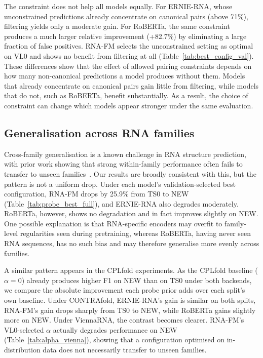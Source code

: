 \documentclass[logo,bsc,singlespacing,parskip]{infthesis}
\begin{document}
The constraint does not help all models equally. For ERNIE-RNA, whose unconstrained predictions already concentrate on canonical pairs (above 71\%), filtering yields only a moderate gain. For RoBERTa, the same constraint produces a much larger relative improvement (+82.7\%) by eliminating a large fraction of false positives. RNA-FM selects the unconstrained setting as optimal on VL0 and shows no benefit from filtering at all (Table~\ref{tab:best_config_val}). These differences show that the effect of allowed pairing constraints depends on how many non-canonical predictions a model produces without them. Models that already concentrate on canonical pairs gain little from filtering, while models that do not, such as RoBERTa, benefit substantially. As a result, the choice of constraint can change which models appear stronger under the same evaluation.

\subsection{Generalisation across RNA families}
\label{sec:disc_generalisation}
Cross-family generalisation is a known challenge in RNA structure prediction, with prior work showing that strong within-family performance often fails to transfer to unseen families~\citep{szikszai2022}. Our results are broadly consistent with this, but the pattern is not a uniform drop. Under each model's validation-selected best configuration, RNA-FM drops by 25.9\% from TS0 to NEW (Table~\ref{tab:probe_best_full}), and ERNIE-RNA also degrades moderately. RoBERTa, however, shows no degradation and in fact improves slightly on NEW. One possible explanation is that RNA-specific encoders may overfit to family-level regularities seen during pretraining, whereas RoBERTa, having never seen RNA sequences, has no such bias and may therefore generalise more evenly across families.

A similar pattern appears in the CPLfold experiments. As the CPLfold baseline ($\alpha = 0$) already produces higher F1 on NEW than on TS0 under both backends, we compare the absolute improvement each probe prior adds over each split's own baseline. Under CONTRAfold, ERNIE-RNA's gain is similar on both splits, RNA-FM's gain drops sharply from TS0 to NEW, while RoBERTa gains slightly more on NEW. Under ViennaRNA, the contrast becomes clearer. RNA-FM's VL0-selected $\alpha$ actually degrades performance on NEW (Table~\ref{tab:alpha_vienna}), showing that a configuration optimised on in-distribution data does not necessarily transfer to unseen families. 
\end{document}
